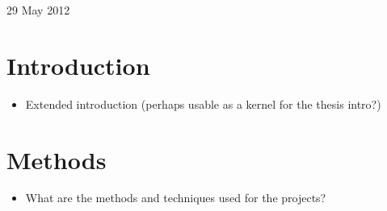 \documentclass[useAMS,usenatbib,onecolumn]{mnras}
\begin{document}
\begin{center}
29 May 2012
\end{center}
\newpage

\date{Date of the review}

\section{Introduction}
\label{sec:introduction}

\begin{itemize}
	\item{Extended introduction (perhaps usable as a kernel for the thesis intro?)}
\end{itemize}

\section{Methods}
\label{sec:methods}

\begin{itemize}
	\item{What are the methods and techniques used for the projects?}
\end{itemize}

\end{document}
